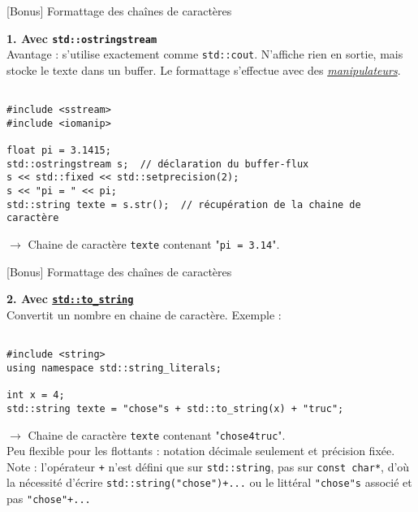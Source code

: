 \documentclass[c]{beamer}
\newcommand{\inline}[1]{\texttt{#1}}
\begin{document}
\begin{frame}[fragile]{[Bonus] Formattage des chaînes de caractères}

\large{\textbf{1. Avec \texttt{std::ostringstream}}}\\

Avantage : s'utilise exactement comme \texttt{std::cout}. N'affiche rien en sortie, mais stocke le texte dans un buffer. Le formattage s'effectue avec des \href{https://en.cppreference.com/w/cpp/io/manip}{\textit{manipulateurs}}.

\begin{verbatim}

#include <sstream>
#include <iomanip>

float pi = 3.1415;
std::ostringstream s;  // déclaration du buffer-flux
s << std::fixed << std::setprecision(2);
s << "pi = " << pi;
std::string texte = s.str();  // récupération de la chaine de caractère

\end{verbatim}

$\rightarrow$ Chaine de caractère \texttt{texte} contenant "\texttt{pi = 3.14}".

\end{frame}

\begin{frame}[fragile]{[Bonus] Formattage des chaînes de caractères}

\large{\textbf{2. Avec \href{https://en.cppreference.com/w/cpp/string/basic_string/to_string}{\texttt{std::to\_string}}}}\\
  
Convertit un nombre en chaine de caractère. Exemple :

\begin{verbatim}

#include <string>
using namespace std::string_literals;

int x = 4;
std::string texte = "chose"s + std::to_string(x) + "truc";

\end{verbatim}

$\rightarrow$ Chaine de caractère \texttt{texte} contenant "\texttt{chose4truc}".\\
  
\small{Peu flexible pour les flottants : notation décimale seulement et précision fixée.\\Note : l'opérateur \texttt{+} n'est défini que sur \inline{std::string}, pas sur \inline{const char*}, d'où la nécessité d'écrire \inline{std::string("chose")+...} ou le littéral \inline{"chose"s} associé et pas \inline{"chose"+...}}\\
\end{frame}
\end{document}
